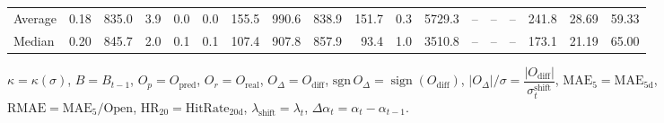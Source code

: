 \begin{threeparttable}
{\begin{tabular}{lrrrrrrrrrrrrrrrrr}
Average &     0.18 & 835.0 &               3.9 &               0.0 &                0.0 &              155.5 &  990.6 & 838.9 &      151.7 &                      0.3 &              5729.3 &         -- &        -- &             -- &            241.8 &           28.69 &                  59.33 \\
 Median &     0.20 & 845.7 &               2.0 &               0.1 &                0.1 &              107.4 &  907.8 & 857.9 &       93.4 &                      1.0 &              3510.8 &         -- &        -- &             -- &            173.1 &           21.19 &                  65.00 \\
\bottomrule
\end{tabular}
}
\begin{tablenotes}\footnotesize
\item $\kappa=\kappa(\sigma)$, $B=B_{t-1}$, $O_p=O_{\text{pred}}$, $O_r=O_{\text{real}}$, $O_\Delta=O_{\text{diff}}$, $\mathrm{sgn}\,O_\Delta=\operatorname{sign}(O_{\text{diff}})$, $|O_\Delta|/\sigma=\dfrac{|O_{\text{diff}}|}{\sigma_t^{\text{shift}}}$, $\mathrm{MAE}_5=\mathrm{MAE}_{5\text{d}}$, $\mathrm{RMAE}= \mathrm{MAE}_5 / \text{Open}$, $\mathrm{HR}_{20}=\mathrm{HitRate}_{20\text{d}}$, 
$\lambda_{\text{shift}}=\lambda_t$, 
$\Delta\alpha_t=\alpha_t-\alpha_{t-1}$.
\end{tablenotes}
\end{threeparttable}
\endgroup

